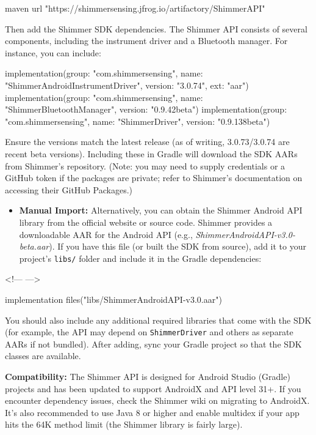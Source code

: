     maven { 
        url "https://shimmersensing.jfrog.io/artifactory/ShimmerAPI" 
    }

Then add the Shimmer SDK dependencies. The Shimmer API consists of
several components, including the instrument driver and a Bluetooth
manager. For instance, you can include:

    implementation(group: "com.shimmersensing", name: "ShimmerAndroidInstrumentDriver", version: "3.0.74", ext: "aar")
    implementation(group: "com.shimmersensing", name: "ShimmerBluetoothManager", version: "0.9.42beta")
    implementation(group: "com.shimmersensing", name: "ShimmerDriver", version: "0.9.138beta")

Ensure the versions match the latest release (as of writing,
3.0.73/3.0.74 are recent beta
versions\cite{WHOStressDefinition}\cite{CortisolStressIndicator2020}).
Including these in Gradle will download the SDK AARs from Shimmer's
repository. (Note: you may need to supply credentials or a GitHub token
if the packages are private; refer to Shimmer's documentation on
accessing their GitHub Packages.)

\begin{itemize}
\item \textbf{Manual Import:} Alternatively, you can obtain the Shimmer Android
  API library from the official website or source code. Shimmer provides
  a downloadable AAR for the Android API (e.g.,
  \textit{ShimmerAndroidAPI-v3.0-beta.aar}). If you have this file (or built
  the SDK from source), add it to your project's \texttt{libs/} folder and
  include it in the Gradle dependencies:

\end{itemize}
<!--- --->

    implementation files("libs/ShimmerAndroidAPI-v3.0.aar")

You should also include any additional required libraries that come with
the SDK (for example, the API may depend on \texttt{ShimmerDriver} and others
as separate AARs if not bundled). After adding, sync your Gradle project
so that the SDK classes are available.

\textbf{Compatibility:} The Shimmer API is designed for Android Studio
(Gradle) projects and has been updated to support AndroidX and API level
31+. If you encounter dependency issues, check the Shimmer wiki on
migrating to
AndroidX\cite{WHOStressDefinition}.
It's also recommended to use Java 8 or higher and enable multidex if
your app hits the 64K method limit (the Shimmer library is fairly
large).

